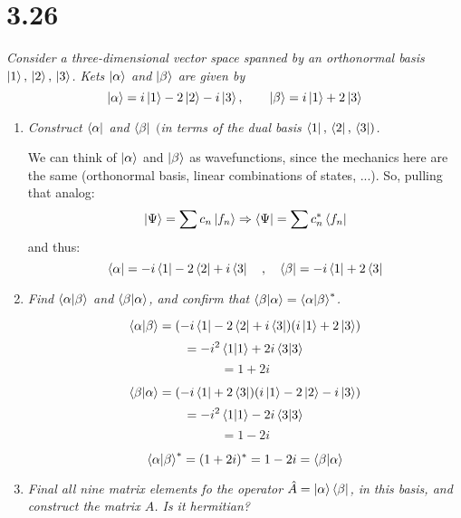 \documentclass[12pt]{article}
\begin{document}
\newpage

\section*{3.26}
\emph{Consider a three-dimensional vector space spanned by an orthonormal basis $\ket{1}, \,\ket{2},\,\ket{3}$. Kets $\ket{\alpha}$ and $\ket{\beta}$ are given by}
 \[\ket{\alpha} = i\ket{1} -2\ket{2}-i\ket{3}, \qquad \ket{\beta} = i\ket{1} + 2\ket{3}\]
\begin{enumerate}[label=\alph*)]
\item \emph{Construct $\bra{\alpha}$ and $\bra{\beta}$ $($in terms of the dual basis $\bra{1},\,\bra{2},\,\bra{3})$.}\bigskip

We can think of $\ket{\alpha}$ and $\ket{\beta}$ as wavefunctions, since the mechanics here are the same (orthonormal basis, linear combinations of states, ...). So, pulling that analog:
\[\ket{\Psi} = \sum c_n \ket{f_n} \Rightarrow \bra{\Psi} = \sum c^*_n \bra{f_n}\]
and thus:
\[\bra{\alpha} = -i \bra{1} -2\bra{2} +i\bra{3} \quad , \quad \bra{\beta} = -i\bra{1} +2\bra{3}\]

\item \emph{Find $\braket{\alpha}{\beta}$ and $\braket{\beta}{\alpha}$, and confirm that $\braket{\beta}{\alpha} = \braket{\alpha}{\beta}^*$.}\bigskip

\[\braket{\alpha}{\beta} = (-i\bra{1} -2\bra{2} +i\bra{3})(i\ket{1} +2\ket{3})\]
\[= -i^2 \braket{1}{1} +2i\braket{3}{3}\]
\[=1+2i\]

\[\braket{\beta}{\alpha} = (-i\bra{1} + 2\bra{3})(i\ket{1} -2\ket{2} -i\ket{3})\]
\[=-i^2\braket{1}{1} -2i\braket{3}{3}\]
\[=1-2i\]

\[\braket{\alpha}{\beta}^* = (1+2i)^* = 1-2i = \braket{\beta}{\alpha}\]

\item \emph{Final all nine matrix elements fo the operator $\hat{A} = \ket{\alpha}\bra{\beta}$, in this basis, and construct the matrix $A$. Is it hermitian?}\bigskip


\end{enumerate}
\end{document}
